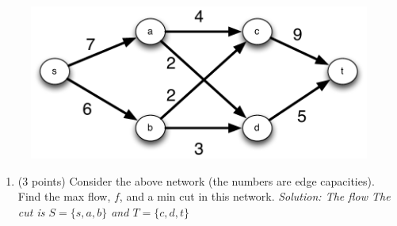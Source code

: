 \documentclass[11pt]{article}
\newcommand{\ans}[1]{\emph{Solution: #1}}
\begin{document}
\begin{enumerate}
\begin{figure}[h]
\begin{center}
\includegraphics[scale=0.4]{nf.pdf} 
\caption{}
\label{f:path}
\end{center}
\end{figure}

\begin{enumerate}

\item (3 points) Consider the above network (the numbers are edge capacities).  Find the max flow, $f$,  and a min cut in this network.  
\ans{The flow The cut is $S = \{s,a,b\}$ and $T = \{c,d,t\}$ } \\ \ \\ \ \\ \ \\ \ \\ \ \\ \ \\ \ \\ \ \\ \ \\


\end{enumerate}
\end{enumerate}
\end{document}
